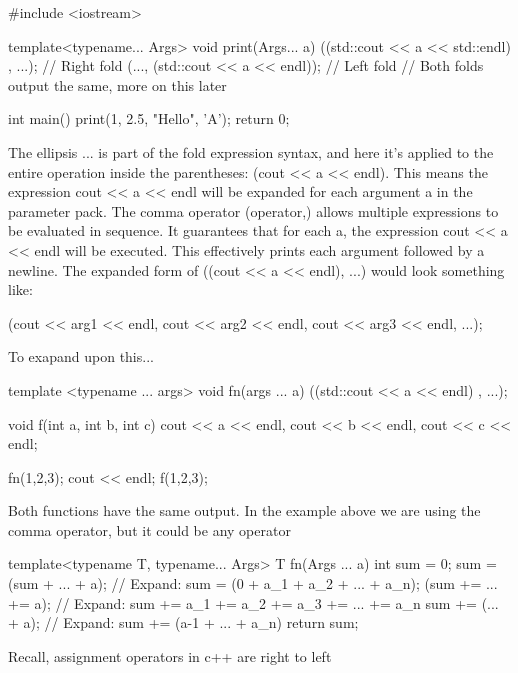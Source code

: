\documentclass{report}
\begin{document}
     \begin{cppcode}
         #include <iostream>

         template<typename... Args>
         void print(Args... a) {
             ((std::cout << a << std::endl) , ...); // Right fold
              (..., (std::cout << a << endl)); // Left fold
              // Both folds output the same, more on this later
         }

         int main() {
             print(1, 2.5, "Hello", 'A');
             return 0;
         }
     \end{cppcode}
     \bigbreak \noindent 
     The ellipsis ... is part of the fold expression syntax, and here it’s applied to the entire operation inside the parentheses: (cout << a << endl). This means the expression cout << a << endl will be expanded for each argument a in the parameter pack.
     \bigbreak \noindent 
     The comma operator (operator,) allows multiple expressions to be evaluated in sequence. It guarantees that for each a, the expression cout << a << endl will be executed. This effectively prints each argument followed by a newline.
     \bigbreak \noindent 
     \bigbreak \noindent 
     The expanded form of ((cout << a << endl), ...) would look something like:
     \bigbreak \noindent 
     \begin{cppcode}
         (cout << arg1 << endl, cout << arg2 << endl, cout << arg3 << endl, ...);
     \end{cppcode}
     \bigbreak \noindent 
     To exapand upon this...
     \bigbreak \noindent 
     \begin{cppcode}
         template <typename ... args>
         void fn(args ... a) {
             ((std::cout << a << endl) , ...);
         }

         void f(int a, int b, int c) {
             cout << a << endl, cout << b << endl, cout << c << endl;
         }

         fn(1,2,3);
         cout << endl;
         f(1,2,3);
     \end{cppcode}
     \bigbreak \noindent 
     Both functions have the same output.
     \bigbreak \noindent 
     In the example above we are using the comma operator, but it could be any operator
     \bigbreak \noindent 
     \begin{cppcode}
         template<typename T, typename... Args>
         T fn(Args ... a) {
             int sum = 0;
             sum = (sum + ... + a); // Expand: sum = (0 + a_1 + a_2 + ... + a_n);
             (sum += ... += a); // Expand: sum += a_1 += a_2 += a_3 += ... += a_n
             sum += (... + a); // Expand: sum += (a-1 + ... + a_n)
             return sum;
         }
     \end{cppcode}
     \bigbreak \noindent
     Recall, assignment operators in c++ are right to left
\end{document}
